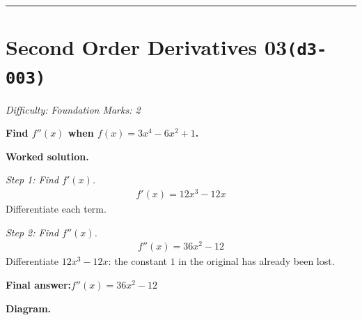 \documentclass[11pt]{article}
\newcommand{\question}[1]{\par\medskip\noindent\textbf{#1}\par}
\begin{document}
\medskip\hrule

\section*{Second Order Derivatives 03\quad\small\texttt{(d3-003)}}
\textit{Difficulty: Foundation \quad\textbar\quad Marks: 2}

\question{Find \( f''(x) \) when \( f(x) = 3x^4 - 6x^2 + 1 \).}

\textbf{Worked solution.}

\textit{Step 1: Find \( f'(x) \).}
\[\begin{gathered}
f'(x) = 12x^3 - 12x
\end{gathered}\]
Differentiate each term.

\textit{Step 2: Find \( f''(x) \).}
\[\begin{gathered}
f''(x) = 36x^2 - 12
\end{gathered}\]
Differentiate \(12x^3 - 12x\): the constant \(1\) in the original has already been lost.

\begin{answerbox}
\textbf{Final answer:}\quad \(\displaystyle  f''(x) = 36x^2 - 12 \)
\end{answerbox}
\textbf{Diagram.}
\end{document}
